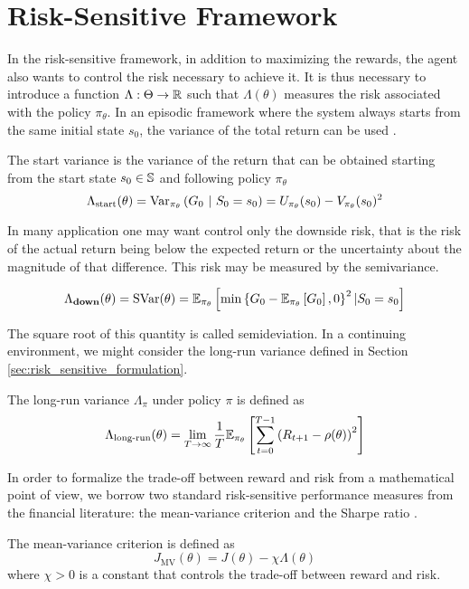 \section{Risk-Sensitive Framework}
In the risk-sensitive framework, in addition to maximizing the rewards, the agent also wants to control the risk necessary to achieve it. It is thus necessary to introduce a function $\Lambda: \Theta \to \R$ such that $\Lambda(\theta)$ measures the risk associated with the policy $\pi_\theta$. In an episodic framework where the system always starts from the same initial state $s_0$, the variance of the total return can be used \cite{tamar2012policy}.
\begin{definition}
	The start variance is the variance of the return that can be obtained starting from the start state $s_0 \in \S$ and following policy $\pi_\theta$
	\begin{equation}
		\Lambda_{\text{start}}(\theta) = \Var[\pi_\theta]{G_0\ |\ S_0 = s_0}
			= U_{\pi_\theta} (s_0) - V_{\pi_\theta} (s_0)^2 
	\end{equation}
\end{definition}
In many application one may want control only the downside risk, that is the risk of the actual return being below the expected return or the uncertainty about the magnitude of that difference. This risk may be measured by the semivariance.
\begin{definition}[Semivariance]
	\begin{equation}
		\Lambda_\textbf{down}(\theta) = \text{SVar}(\theta) = \E[\pi_\theta]{\min\left\{G_0 - \E[\pi_\theta]{G_0}, 0\right\}^2 | S_0 = s_0}
	\end{equation}
\end{definition}	
The square root of this quantity is called semideviation. In a continuing environment, we might consider the long-run variance \cite{prashanth2014actor} defined in Section \ref{sec:risk_sensitive_formulation}.
\begin{definition}
	The long-run variance $\Lambda_\pi$ under policy $\pi$ is defined as
	\begin{equation}
		\begin{split}
			\Lambda_{\text{long-run}}(\theta) &= \lim_{T \to \infty} \frac{1}{T} \E[\pi_\theta]{
			\sum^{T-1}_{t=0} \left(R_{t+1} - \rho(\theta)\right)^2}\\
		\end{split}
	\end{equation}
\end{definition}
In order to formalize the trade-off between reward and risk from a mathematical point of view, we borrow two standard risk-sensitive performance measures from the financial literature: the mean-variance criterion \cite{markowitz1952portfolio} and the Sharpe ratio \cite{sharpe1994sharpe}.
\begin{definition}
	The mean-variance criterion is defined as 
	\begin{equation}
		J_\text{MV}(\theta) = J(\theta) - \chi \Lambda(\theta)
	\end{equation}
	where $\chi > 0$ is a constant that controls the trade-off between reward and risk. 
\end{definition} 

